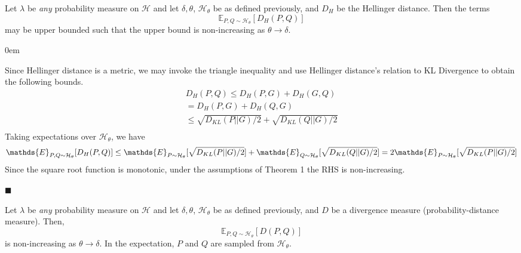 \documentclass[12pt]{article}
\renewcommand{\qed}{\hfill$\blacksquare$}
\renewenvironment{proof}{\begin{addmargin}[1em]{0em}\begin{newproof}}{\end{newproof}\end{addmargin}\qed}
\newenvironment{theorem}[2][Theorem]{\begin{trivlist}
\item[\hskip \labelsep {\bfseries #1}\hskip \labelsep {\bfseries #2.}]}{\end{trivlist}}
\newenvironment{proposition}[2][Proposition]{\begin{trivlist}
\item[\hskip \labelsep {\bfseries #1}\hskip \labelsep {\bfseries #2.}]}{\end{trivlist}}
\begin{document}
\begin{proposition}{Hellinger Bound}
    Let $\lambda$ be \emph{any} probability measure on $\mathcal{H}$ and let $\delta,\theta$, $\mathcal{H}_\theta$ be as defined previously, and $D_H$ be the Hellinger distance. Then the terms
    \begin{equation*}
        \mathds{E}_{P,Q\sim \mathcal{H}_\theta}[D_H(P,Q)]
    \end{equation*}
    may be upper bounded such that the upper bound is non-increasing as $\theta \rightarrow \delta$. 
\end{proposition}

\begin{proof}
    Since Hellinger distance is a metric, we may invoke the triangle inequality and use Hellinger distance's relation to KL Divergence to obtain the following bounds. 
    \begin{gather*}
        D_H(P,Q) \leq D_H(P,G) + D_H(G,Q) \\
        = D_H(P,G) + D_H(Q,G) \\
        \leq \sqrt{D_{KL}(P||G)/2} + \sqrt{D_{KL}(Q||G)/2} \\
    \end{gather*}
    Taking expectations over $\mathcal{H}_{\theta}$, we have
    \begin{equation*}
        \mathds{E}_{P,Q\sim \mathcal{H}_\theta}[D_H(P,Q)] \leq \mathds{E}_{P\sim \mathcal{H}_\theta}[\sqrt{D_{KL}(P||G)/2}] + \mathds{E}_{Q\sim \mathcal{H}_\theta}[\sqrt{D_{KL}(Q||G)/2}] \\
        = 2\mathds{E}_{P\sim \mathcal{H}_\theta}[\sqrt{D_{KL}(P||G)/2}]
    \end{equation*}
    Since the square root function is monotonic, under the assumptions of Theorem 1 the RHS is non-increasing. 
\end{proof}

\begin{theorem}{Main}
    Let $\lambda$ be \emph{any} probability measure on $\mathcal{H}$ and let $\delta,\theta$, $\mathcal{H}_\theta$ be as defined previously, and $D$ be a divergence measure (probability-distance measure). Then,
    \begin{equation*}
        \mathds{E}_{P,Q\sim \mathcal{H}_\theta}[D(P,Q)]
    \end{equation*}
    is non-increasing as $\theta \rightarrow \delta$. In the expectation, $P$ and $Q$ are sampled from $\mathcal{H}_\theta$. 
\end{theorem}
\end{document}
